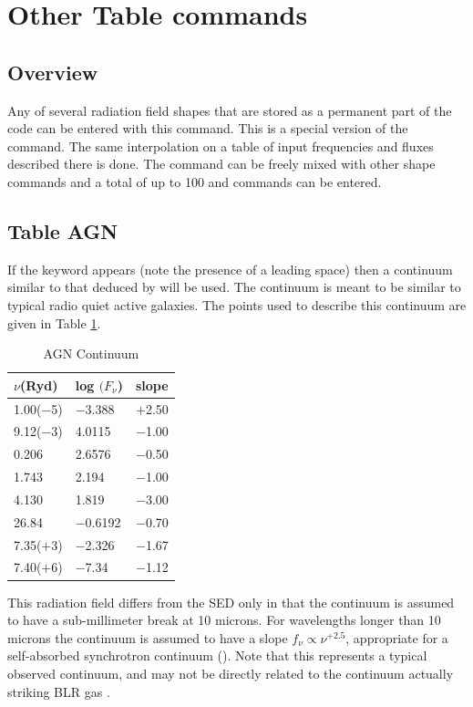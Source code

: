 \section{Other Table commands}

\subsection{Overview}

Any of several radiation field shapes that are stored as a permanent part
of the code can be entered with this command.
This is a special version of
the  command.
The same interpolation
on a table of input frequencies and fluxes described there is done.
The  command can be freely mixed with other
shape commands and a total
of up to 100  and  commands
can be entered.

\subsection{Table AGN }
\noindent If the keyword  appears
(note the presence of a leading space) then
a continuum similar to that deduced by \citet{Mathews1987} will be
used.  The continuum is meant to be similar to typical radio quiet active
galaxies.
The points used to describe this continuum are given in
Table \ref{tab:AGNcontinuum}.

\begin{table}
\centering
\caption{AGN Continuum}
\begin{tabular}{lll}\hline
\label{tab:AGNcontinuum}
$\nu$(Ryd)& log $(F_\nu$)& slope\\
\hline
1.00($-$5)&$-$3.388& $+$2.50\\
9.12($-$3)&4.0115& $-$1.00\\
0.206& 2.6576& $-$0.50\\
1.743& 2.194& $-$1.00\\
4.130& 1.819& $-$3.00\\
26.84& $-$0.6192& $-$0.70\\
7.35($+$3)& $-$2.326& $-$1.67\\
7.40($+$6)& $-$7.34& $-$1.12\\
\hline
\end{tabular}
\end{table}

This radiation field differs from the \citet{Mathews1987} SED
only in that the continuum is assumed to have a sub-millimeter break at
10 microns.
For wavelengths longer than 10 microns the continuum is assumed
to have a slope $f_\nu\propto \nu^{+2.5}$,
appropriate for a self-absorbed synchrotron
continuum (\citealp{Rybicki1979}).
Note that this represents a typical
observed continuum,
and may not be directly related to the continuum actually
striking BLR gas \citep{KoristaFerlandBaldwin1997}.

